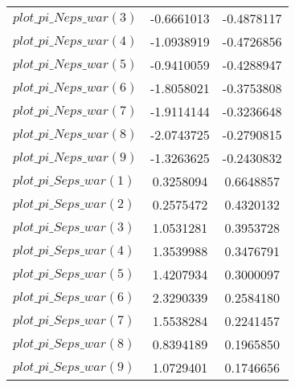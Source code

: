 \begin{center}
\begin{longtable}{lcc}
$plot\_pi\_N eps\_war (3)   $	 & 	     -0.6661013	 & 	     -0.4878117 \\ 
$plot\_pi\_N eps\_war (4)   $	 & 	     -1.0938919	 & 	     -0.4726856 \\ 
$plot\_pi\_N eps\_war (5)   $	 & 	     -0.9410059	 & 	     -0.4288947 \\ 
$plot\_pi\_N eps\_war (6)   $	 & 	     -1.8058021	 & 	     -0.3753808 \\ 
$plot\_pi\_N eps\_war (7)   $	 & 	     -1.9114144	 & 	     -0.3236648 \\ 
$plot\_pi\_N eps\_war (8)   $	 & 	     -2.0743725	 & 	     -0.2790815 \\ 
$plot\_pi\_N eps\_war (9)   $	 & 	     -1.3263625	 & 	     -0.2430832 \\ 
$plot\_pi\_S eps\_war (1)   $	 & 	      0.3258094	 & 	      0.6648857 \\ 
$plot\_pi\_S eps\_war (2)   $	 & 	      0.2575472	 & 	      0.4320132 \\ 
$plot\_pi\_S eps\_war (3)   $	 & 	      1.0531281	 & 	      0.3953728 \\ 
$plot\_pi\_S eps\_war (4)   $	 & 	      1.3539988	 & 	      0.3476791 \\ 
$plot\_pi\_S eps\_war (5)   $	 & 	      1.4207934	 & 	      0.3000097 \\ 
$plot\_pi\_S eps\_war (6)   $	 & 	      2.3290339	 & 	      0.2584180 \\ 
$plot\_pi\_S eps\_war (7)   $	 & 	      1.5538284	 & 	      0.2241457 \\ 
$plot\_pi\_S eps\_war (8)   $	 & 	      0.8394189	 & 	      0.1965850 \\ 
$plot\_pi\_S eps\_war (9)   $	 & 	      1.0729401	 & 	      0.1746656 \\ 
\end{longtable}
 \end{center}
